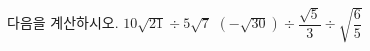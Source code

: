 다음을 계산하시오.
 $10\sqrt{21}\div 5\sqrt{7}$
 $(-\sqrt{30})\div\dfrac{\sqrt{5}}{3}\div\sqrt{\dfrac{6}{5}}$
